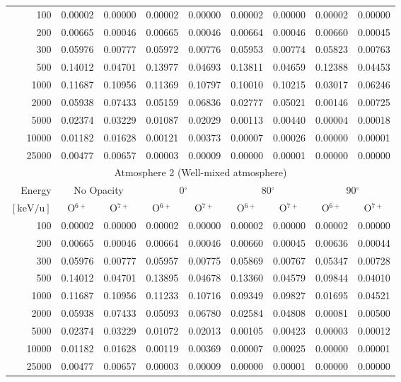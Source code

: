 \begin{table}[ht]
\begin{tabular}{r|c|c|c|c|c|c|c|c}
    
    100   & 0.00002 & 0.00000 & 0.00002 & 0.00000 & 0.00002 & 0.00000 & 0.00002 & 0.00000 \\
    200   & 0.00665 & 0.00046 & 0.00665 & 0.00046 & 0.00664 & 0.00046 & 0.00660 & 0.00045 \\
    300   & 0.05976 & 0.00777 & 0.05972 & 0.00776 & 0.05953 & 0.00774 & 0.05823 & 0.00763 \\
    500   & 0.14012 & 0.04701 & 0.13977 & 0.04693 & 0.13811 & 0.04659 & 0.12388 & 0.04453 \\
    1000  & 0.11687 & 0.10956 & 0.11369 & 0.10797 & 0.10010 & 0.10215 & 0.03017 & 0.06246 \\
    2000  & 0.05938 & 0.07433 & 0.05159 & 0.06836 & 0.02777 & 0.05021 & 0.00146 & 0.00725 \\
    5000  & 0.02374 & 0.03229 & 0.01087 & 0.02029 & 0.00113 & 0.00440 & 0.00004 & 0.00018 \\
    10000 & 0.01182 & 0.01628 & 0.00121 & 0.00373 & 0.00007 & 0.00026 & 0.00000 & 0.00001 \\
    25000 & 0.00477 & 0.00657 & 0.00003 & 0.00009 & 0.00000 & 0.00001 & 0.00000 & 0.00000 \\ \cline{1-9}
    \multicolumn{9}{c}{Atmosphere 2 (Well-mixed atmosphere)} \\ \cline{2-9}
    Energy & \multicolumn{2}{c|}{No Opacity} & \multicolumn{2}{c|}{0$^\circ$} & \multicolumn{2}{c|}{80$^\circ$} & \multicolumn{2}{c}{90$^\circ$} \\ \cline{2-9}
    $\mathrm{[keV/u]}$ & O$^{6+}$ & O$^{7+}$ & O$^{6+}$ & O$^{7+}$ & O$^{6+}$ & O$^{7+}$ & O$^{6+}$ & O$^{7+}$ \\ \cline{1-9}
    100   & 0.00002 & 0.00000 & 0.00002 & 0.00000 & 0.00002 & 0.00000 & 0.00002 & 0.00000 \\
    200   & 0.00665 & 0.00046 & 0.00664 & 0.00046 & 0.00660 & 0.00045 & 0.00636 & 0.00044 \\
    300   & 0.05976 & 0.00777 & 0.05957 & 0.00775 & 0.05869 & 0.00767 & 0.05347 & 0.00728 \\
    500   & 0.14012 & 0.04701 & 0.13895 & 0.04678 & 0.13360 & 0.04579 & 0.09844 & 0.04010 \\
    1000  & 0.11687 & 0.10956 & 0.11233 & 0.10716 & 0.09349 & 0.09827 & 0.01695 & 0.04521 \\
    2000  & 0.05938 & 0.07433 & 0.05093 & 0.06780 & 0.02584 & 0.04808 & 0.00081 & 0.00500 \\
    5000  & 0.02374 & 0.03229 & 0.01072 & 0.02013 & 0.00105 & 0.00423 & 0.00003 & 0.00012 \\
    10000 & 0.01182 & 0.01628 & 0.00119 & 0.00369 & 0.00007 & 0.00025 & 0.00000 & 0.00001 \\
    25000 & 0.00477 & 0.00657 & 0.00003 & 0.00009 & 0.00000 & 0.00001 & 0.00000 & 0.00000 \\ \cline{1-9}
    \end{tabular}
    \label{tab:XRayEffOCX}
\end{table}

